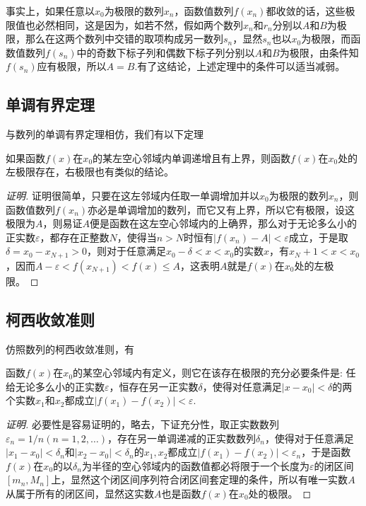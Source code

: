 事实上，如果任意以$x_0$为极限的数列$x_n$，函数值数列$f(x_n)$都收敛的话，这些极限值也必然相同，这是因为，如若不然，假如两个数列$x_n$和$r_n$分别以$A$和$B$为极限，那么在这两个数列中交错的取项构成另一数列$s_n$，显然$s_n$也以$x_0$为极限，而函数值数列$f(s_n)$中的奇数下标子列和偶数下标子列分别以$A$和$B$为极限，由条件知$f(s_n)$应有极限，所以$A=B$.有了这结论，上述定理中的条件可以适当减弱。


\subsection{单调有界定理}
\label{sec:theorem-of-monotone-and-bounded-of-function-limit}

与数列的单调有界定理相仿，我们有以下定理
\begin{theorem}
  如果函数$f(x)$在$x_0$的某左空心邻域内单调递增且有上界，则函数$f(x)$在$x_0$处的左极限存在，右极限也有类似的结论。
\end{theorem}

\begin{proof}[证明]
证明很简单，只要在这左邻域内任取一单调增加并以$x_0$为极限的数列$x_n$，则函数值数列$f(x_n)$亦必是单调增加的数列，而它又有上界，所以它有极限，设这极限为$A$，则易证$A$便是函数在这左空心邻域内的上确界，那么对于无论多么小的正实数$\varepsilon$，都存在正整数$N$，使得当$n>N$时恒有$|f(x_n)-A|<\varepsilon$成立，于是取$\delta = x_0-x_{N+1}>0$，则对于任意满足$x_0-\delta<x<x_0$的实数$x$，有$x_N+1<x<x_0$，因而$A-\varepsilon<f(x_{N+1})<f(x) \leqslant A$，这表明$A$就是$f(x)$在$x_0$处的左极限。
\end{proof}

\subsection{柯西收敛准则}
\label{sec:cauchy-convergence-rule-of-function-limit}

仿照数列的柯西收敛准则，有
\begin{theorem}
  函数$f(x)$在$x_0$的某空心邻域内有定义，则它在该存在极限的充分必要条件是: 任给无论多么小的正实数$\varepsilon$，恒存在另一正实数$\delta$，使得对任意满足$|x-x_0|<\delta$的两个实数$x_1$和$x_2$都成立$|f(x_1)-f(x_2)|<\varepsilon$.
\end{theorem}

\begin{proof}[证明]
  必要性是容易证明的，略去，下证充分性，取正实数数列$\varepsilon_n=1/n(n=1,2,\ldots)$，存在另一单调递减的正实数数列$\delta_n$，使得对于任意满足$|x_1-x_0|<\delta_n$和$|x_2-x_0|<\delta_n$的$x_1,x_2$都成立$|f(x_1)-f(x_2)|<\varepsilon_n$，于是函数$f(x)$在$x_0$的以$\delta_n$为半径的空心邻域内的函数值都必将限于一个长度为$\varepsilon$的闭区间$[m_n,M_n]$上，显然这个闭区间序列符合闭区间套定理的条件，所以有唯一实数$A$从属于所有的闭区间，显然这实数$A$也是函数$f(x)$在$x_0$处的极限。
\end{proof}


